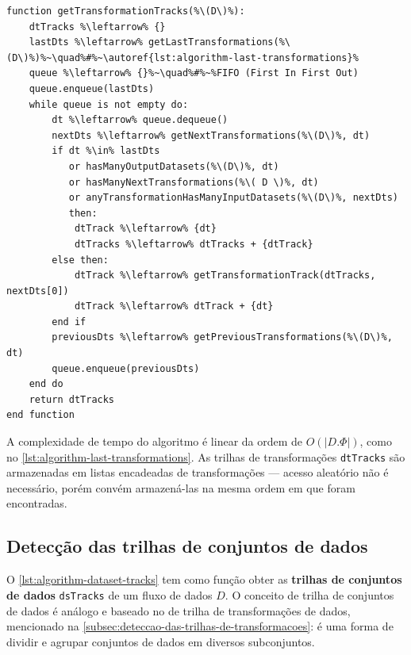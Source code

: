 \begin{minipage}[c]{0.95\textwidth}
\begin{lstlisting}[language=pseudocode,label={lst:algorithm-transformation-tracks},caption={[Detecção das trilhas de transformações]Detecção do rastro do fluxo de dados no nível de trilhas de transformações.}]
function getTransformationTracks(%\(D\)%):
    dtTracks %\leftarrow% {}
    lastDts %\leftarrow% getLastTransformations(%\(D\)%)%~\quad%#%~\autoref{lst:algorithm-last-transformations}%
    queue %\leftarrow% {}%~\quad%#%~%FIFO (First In First Out)
    queue.enqueue(lastDts)
    while queue is not empty do:
        dt %\leftarrow% queue.dequeue()
        nextDts %\leftarrow% getNextTransformations(%\(D\)%, dt)
        if dt %\in% lastDts
           or hasManyOutputDatasets(%\(D\)%, dt)
           or hasManyNextTransformations(%\( D \)%, dt)
           or anyTransformationHasManyInputDatasets(%\(D\)%, nextDts)
           then:
            dtTrack %\leftarrow% {dt}
            dtTracks %\leftarrow% dtTracks + {dtTrack}
        else then:
            dtTrack %\leftarrow% getTransformationTrack(dtTracks, nextDts[0])
            dtTrack %\leftarrow% dtTrack + {dt}
        end if
        previousDts %\leftarrow% getPreviousTransformations(%\(D\)%, dt)
        queue.enqueue(previousDts)
    end do
    return dtTracks
end function
\end{lstlisting}
\end{minipage}

A complexidade de tempo do algoritmo é linear da ordem de \( O(|D.\Phi|) \), como no \autoref{lst:algorithm-last-transformations}. As trilhas de transformações \texttt{dtTracks} são armazenadas em listas encadeadas de transformações --- acesso aleatório não é necessário, porém convém armazená-las na mesma ordem em que foram encontradas.

\subsection{Detecção das trilhas de conjuntos de dados}

O \autoref{lst:algorithm-dataset-tracks} tem como função obter as \textbf{trilhas de conjuntos de dados} \texttt{dsTracks} de um fluxo de dados \( D \). O conceito de trilha de conjuntos de dados é análogo e baseado no de trilha de transformações de dados, mencionado na \autoref{subsec:deteccao-das-trilhas-de-transformacoes}: é uma forma de dividir e agrupar conjuntos de dados em diversos subconjuntos.

